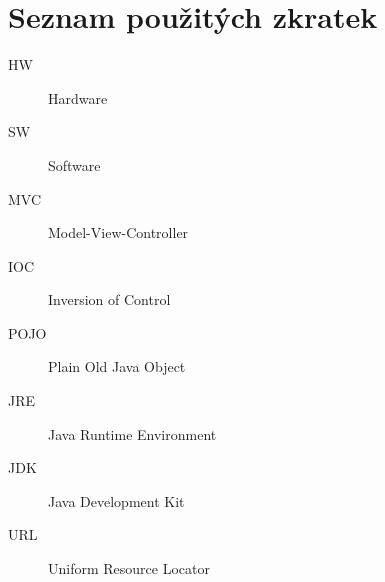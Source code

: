 \documentclass[thesis=B,czech]{FITthesis}[2012/06/26]
\begin{document}



\appendix

\chapter{Seznam použitých zkratek}
\begin{description}
	\item[HW] Hardware
	\item[SW] Software
	\item[MVC] Model-View-Controller
	\item[IOC] Inversion of Control
	\item[POJO] Plain Old Java Object
	\item[JRE] Java Runtime Environment
	\item[JDK] Java Development Kit
	\item[URL] Uniform Resource Locator
\end{description}
\end{document}
